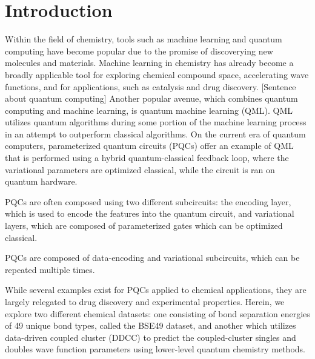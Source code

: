 \documentclass[journal=jacsat,manuscript=article]{achemso}
\begin{document}
\section{Introduction}
Within the field of chemistry, tools such as machine learning and quantum computing have become popular due to the promise of discoverying new molecules and materials.
Machine learning in chemistry has already become a broadly applicable tool for exploring chemical compound space\cite{ramakrishnan_quantum_2014,ramakrishnan_big_2015}, accelerating wave functions\cite{townsend_data-driven_2019,jones_chapter_2023}, and for applications, such as catalysis and drug discovery.\cite{behler_perspective_2016,goh_deep_2017,butler_machine_2018,sanchez-lengeling_inverse_2018,janet_machine_2020}
[Sentence about quantum computing]
Another popular avenue, which combines quantum computing and machine learning, is quantum machine learning (QML).
QML utilizes quantum algorithms during some portion of the machine learning process in an attempt to outperform classical algorithms. \cite{biamonte_quantum_2017}
On the current era of quantum computers, parameterized quantum circuits (PQCs) offer an example of QML that is performed using a hybrid quantum-classical feedback loop, where the variational parameters are optimized classical, while the circuit is ran on quantum hardware.\cite{benedetti_parameterized_2019,suzuki_predicting_2020}

PQCs are often composed using two different subcircuits: the encoding layer, which is used to encode the features into the quantum circuit, and variational layers, which are composed of parameterized gates which can be optimized classical. 



PQCs are composed of data-encoding and variational subcircuits, which can be repeated multiple times.


While several examples exist for PQCs applied to chemical applications, they are largely relegated to drug discovery\cite{suzuki_predicting_2020,smaldone_quantum--classical_2024,ishiyama_noise-robust_2022,ranga_quantum_2024,alam_qnet_2022,avramouli_quantum_2023,avramouli_unlocking_2023,bhatia_quantum_2023} and experimental properties\cite{hatakeyama-sato_quantum_2023}.
Herein, we explore two different chemical datasets: one consisting of bond separation energies of 49 unique bond types, called the BSE49 dataset\cite{prasad_bse49_2021}, and another which utilizes data-driven coupled cluster (DDCC)\cite{townsend_data-driven_2019} to predict the coupled-cluster singles and doubles wave function parameters using lower-level quantum chemistry methods.
\end{document}
